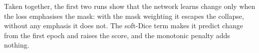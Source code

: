 Taken together, the first two runs show that the network learns change
only when the loss emphasises the mask: with the mask weighting it escapes
the collapse, without any emphasis it does not. The soft-Dice term makes
it predict change from the first epoch and raises the score, and the
monotonic penalty adds nothing.

%

